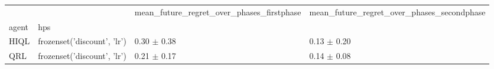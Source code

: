 \begin{tabular}{llll}
\toprule
 &  & mean_future_regret_over_phases_firstphase & mean_future_regret_over_phases_secondphase \\
agent & hps &  &  \\
\midrule
HIQL & frozenset({'discount', 'lr'}) & 0.30 $\pm$ 0.38 & 0.13 $\pm$ 0.20 \\
\cline{1-4}
QRL & frozenset({'discount', 'lr'}) & 0.21 $\pm$ 0.17 & 0.14 $\pm$ 0.08 \\
\cline{1-4}
\bottomrule
\end{tabular}

